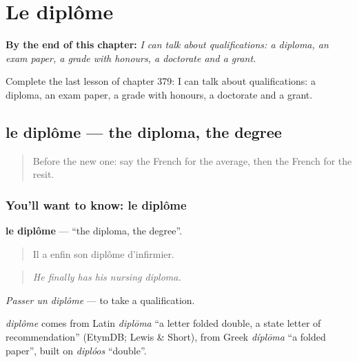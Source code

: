
\chapter{Le diplôme}
\label{ch:fr-le-diplome}

\begin{chapteropening}
\textbf{By the end of this chapter:} \emph{I can talk about qualifications: a diploma, an exam paper, a grade with honours, a doctorate and a grant.}

Complete the last lesson of chapter 379: I can talk about qualifications: a diploma, an exam paper, a grade with honours, a doctorate and a grant.
\end{chapteropening}

\section[le diplôme]{le diplôme — the diploma, the degree}

\label{lesson:FR-C379-diplome}



\begin{quote}
Before the new one: say the French for the average, then the French for the resit.
\end{quote}

\subsection*{You'll want to know: le diplôme}
\textbf{le diplôme} — \textquotedblleft{}the diploma, the degree\textquotedblright{}.

\begin{quote}
Il a enfin son diplôme d'infirmier.
\end{quote}

\begin{quote}
\emph{He finally has his nursing diploma.}
\end{quote}

\emph{Passer un diplôme} — to take a qualification.

\begin{cousinweb}
\emph{diplôme} comes from Latin \emph{diplōma} \textquotedblleft{}a letter folded double, a state letter of recommendation\textquotedblright{} (EtymDB; Lewis \& Short), from Greek \emph{díplōma} \textquotedblleft{}a folded paper\textquotedblright{}, built on \emph{diplóos} \textquotedblleft{}double\textquotedblright{}.
\end{cousinweb}


